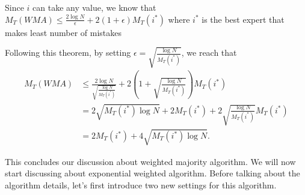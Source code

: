 \documentclass[../main.tex]{subfiles}
\begin{document}
Since $i$ can take any value, we know that $M_T(WMA) \leq \frac{2\log N}{\epsilon} + 2 (1 + \epsilon) M_T(i^*) $ where $i^*$ is the best expert that makes least number of mistakes

Following this theorem, by setting $\epsilon = \sqrt{\frac{\log N}{M_T(i^*)}}$, we reach that 
	\begin{equation*}
\begin{aligned}
M_T(WMA) & \leq \frac{2\log N}{ \sqrt{\frac{\log N}{M_T(i^*)}}} + 2 (1 + \sqrt{\frac{\log N}{M_T(i^*)}}) M_T(i^*)  \\
&= 2\sqrt{M_T(i^*) \log N } + 2 M_T(i^*) + 2\sqrt{\frac{\log N}{M_T(i^*)}} M_T(i^*) \\
& = 2 M_T(i^*) + 4\sqrt{M_T(i^*) \log N }.
\end{aligned}
\end{equation*}

This concludes our discussion about weighted majority algorithm. We will now start discussing about exponential weighted algorithm. Before talking about the algorithm details, let's first introduce two new settings for this algorithm.
\end{document}
